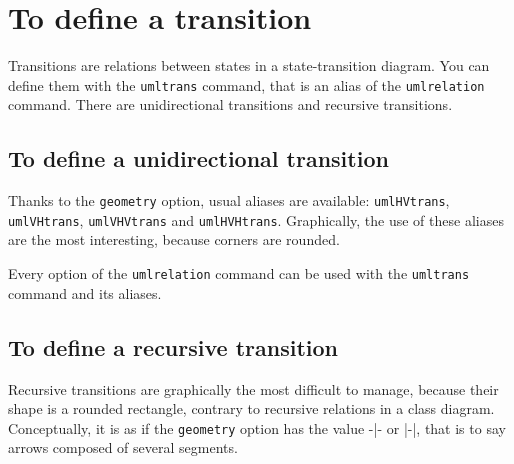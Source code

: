 \documentclass[a4paper,11pt]{report}
\begin{document}
\section{To define a transition}\label{s.trans}

Transitions are relations between states in a state-transition diagram. You can define them with the {\tt umltrans} command, that is an alias of the {\tt umlrelation} command. There are unidirectional transitions and recursive transitions.

\subsection{To define a unidirectional transition}\label{s.unitrans}

Thanks to the {\tt geometry} option, usual aliases are available: {\tt umlHVtrans}, {\tt umlVHtrans}, {\tt umlVHVtrans} and {\tt umlHVHtrans}. Graphically, the use of these aliases are the most interesting, because corners are rounded.

\medskip

\begin{minipage}{0.51\textwidth}

\end{minipage}
\begin{minipage}{0.49\textwidth}
\begin{center}
\end{center}
\end{minipage}

\medskip

Every option of the {\tt umlrelation} command can be used with the {\tt umltrans} command and its aliases.

\subsection{To define a recursive transition}\label{s.rectrans}

Recursive transitions are graphically the most difficult to manage, because their shape is a rounded rectangle, contrary to recursive relations in a class diagram. Conceptually, it is as if the {\tt geometry} option has the value -|- or |-|, that is to say arrows composed of several segments.

\medskip

\begin{minipage}{0.51\textwidth}

\end{minipage}
\begin{minipage}{0.49\textwidth}
\begin{center}
\end{center}
\end{minipage}
\end{document}
